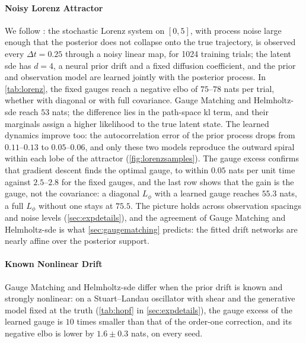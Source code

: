 \documentclass{article} %
\begin{document}
\paragraph{Noisy Lorenz Attractor}
We follow \citet{smith2026closing}: the stochastic Lorenz system on $[0, 5]$, with process noise large enough that the posterior does not collapse onto the true trajectory, is observed every $\Delta t = 0.25$ through a noisy linear map, for 1024 training trials; the latent \gls{sde} has $d = 4$, a neural prior drift and a fixed diffusion coefficient, and the prior and observation model are learned jointly with the posterior process. In \cref{tab:lorenz}, the fixed gauges reach a negative \gls{elbo} of $75$--$78$ nats per trial, whether with diagonal or with full covariance. Gauge Matching and Helmholtz-\gls{sde} reach $53$ nats; the difference lies in the path-space \gls{kl} term, and their marginals assign a higher likelihood to the true latent state. The learned dynamics improve too: the autocorrelation error of the prior process drops from $0.11$--$0.13$ to $0.05$--$0.06$, and only these two models reproduce the outward spiral within each lobe of the attractor (\cref{fig:lorenzsamples}). The gauge excess confirms that gradient descent finds the optimal gauge, to within $0.05$ nats per unit time against $2.5$--$2.8$ for the fixed gauges, and the last row shows that the gain is the gauge, not the covariance: a diagonal $L_\phi$ with a learned gauge reaches $55.3$ nats, a full $L_\phi$ without one stays at $75.5$. The picture holds across observation spacings and noise levels (\cref{sec:expdetails}), and the agreement of Gauge Matching and Helmholtz-\gls{sde} is what \cref{sec:gaugematching} predicts: the fitted drift networks are nearly affine over the posterior support.
\paragraph{Known Nonlinear Drift}
Gauge Matching and Helmholtz-\gls{sde} differ when the prior drift is known and strongly nonlinear: on a Stuart--Landau oscillator with shear and the generative model fixed at the truth (\cref{tab:hopf} in \cref{sec:expdetails}), the gauge excess of the learned gauge is $10$ times smaller than that of the order-one correction, and its negative \gls{elbo} is lower by $1.6 \pm 0.3$ nats, on every seed.
\end{document}
